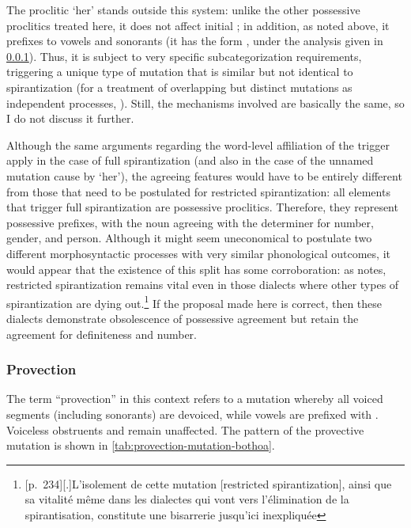 The proclitic \ipa{[i]} `her' stands outside this system: unlike the other possessive proclitics treated here, it does not affect initial \ipa{[hr]}; in addition, as noted above, it prefixes \ipa{[h]} to vowels and sonorants (\ie it has the form \ipa{[ih]}, under the analysis given in \cref{sec:provection-mutation-bothoa}). Thus, it is subject to very specific subcategorization requirements, triggering a unique type of mutation that is similar but not identical to spirantization (for a treatment of overlapping but distinct mutations as independent processes, \cf \citealt{ellis}). Still, the mechanisms involved are basically the same, so I do not discuss it further.

Although the same arguments regarding the word\hyp level affiliation of the trigger apply in the case of full spirantization (and also in the case of the unnamed mutation cause by \ipa{[i]} `her'), the agreeing features would have to be entirely different from those that need to be postulated for restricted spirantization: all elements that trigger full spirantization are possessive proclitics. Therefore, they represent possessive prefixes, with the noun agreeing with the determiner for number, gender, and person. Although it might seem uneconomical to postulate two different morphosyntactic processes with very similar phonological outcomes, it would appear that the existence of this split has some corroboration: as \citet{humphreys95:_phonol_bothoa_saint_nicol_pelem} notes, restricted spirantization remains vital even in those dialects where other types of spirantization are dying out.\footnote{[p.~234][.]{L'isolement de cette mutation \textenglish{[\ie restricted spirantization]}, ainsi que sa vitalité même dans les dialectes qui vont vers l'élimination de la spirantisation, constitute une bisarrerie jusqu'ici inexpliquée}} If the proposal made here is correct, then these dialects demonstrate obsolescence of possessive agreement but retain the agreement for definiteness and number.

\subsubsection{Provection}
\label{sec:provection-mutation-bothoa}

The term \enquote{provection} in this context refers to a mutation whereby all voiced segments (including sonorants) are devoiced, while vowels are prefixed with \ipa{[h]}. Voiceless obstruents and \ipa{[r̥]} remain unaffected. The pattern of the provective mutation is shown in \cref{tab:provection-mutation-bothoa}.


